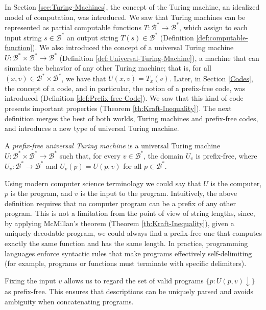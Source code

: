 In Section \ref{sec:Turing-Machines}, the concept of the Turing machine, an idealized model of computation, was introduced. We saw that Turing machines can be represented as partial computable functions $T:\mathcal{B}^\ast \rightarrow \mathcal{B}^\ast$, which assign to each input string $s \in \mathcal{B}^\ast$ an output string $T(s) \in \mathcal{B}^\ast$ (Definition \ref{def:computable-function}). We also introduced the concept of a universal Turing machine $U:\mathcal{B}^\ast \times \mathcal{B}^\ast \rightarrow \mathcal{B}^\ast$ (Definition \ref{def:Universal-Turing-Machine}), a machine that can simulate the behavior of any other Turing machine; that is, for all $(x,v) \in  \mathcal{B}^\ast \times \mathcal{B}^\ast$, we have that $U(x,v) = T_{x}(v)$. Later, in Section \ref{Codes}, the concept of a code, and in particular, the notion of a prefix-free code, was introduced (Definition \ref{def:Prefix-free-Code}). We saw that this kind of code presents important properties (Theorem \ref{th:Kraft-Inequality}). The next definition merges the best of both worlds, Turing machines and prefix-free codes, and introduces a new type of universal Turing machine.

\begin{definition}
A \emph{prefix-free universal Turing machine} is a universal Turing machine $U:\mathcal{B}^\ast \times \mathcal{B}^\ast \rightarrow \mathcal{B}^\ast$ such that, for every $v \in \mathcal{B}^\ast$, the domain $U_{v}$ is prefix-free, where $U_{v}:\mathcal{B}^\ast \rightarrow \mathcal{B}^\ast$ and $U_{v}(p) = U(p, v)$ for all $p \in \mathcal{B}^\ast$.
\end{definition}

Using modern computer science terminology we could say that $U$ is the computer, $p$ is the program, and $v$ is the input to the program. Intuitively, the above definition requires that no computer program can be a prefix of any other program. This is not a limitation from the point of view of string lengths, since, by applying McMillan's theorem (Theorem \ref{th:Kraft-Inequality}), given a uniquely decodable program, we could always find a prefix-free one that computes exactly the same function and has the same length. In practice, programming languages enforce syntactic rules that make programs effectively self-delimiting (for example, programs or functions must terminate with specific delimiters).

Fixing the input $v$ allows us to regard the set of valid programs $\{p : U(p,v)\downarrow\}$ as prefix-free. This ensures that descriptions can be uniquely parsed and avoids ambiguity when concatenating programs.

